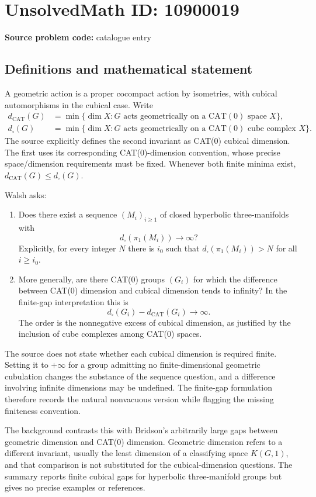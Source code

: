 \documentclass[11pt]{article}
\begin{document}
\section*{UnsolvedMath ID: 10900019}
\textbf{Source problem code:} catalogue entry
\subsection{Definitions and mathematical statement}
A geometric action is a proper cocompact action by isometries, with cubical automorphisms in the cubical case. Write
\[\begin{split}
d_{\mathrm{CAT}}(G)&=\min\{\dim X:G\text{ acts geometrically on a CAT}(0)\text{ space }X\},\\
d_{\square}(G)&=\min\{\dim X:G\text{ acts geometrically on a CAT}(0)\text{ cube complex }X\}.
\end{split}\]
The source explicitly defines the second invariant as CAT(0) cubical dimension. The first uses its corresponding CAT(0)-dimension convention, whose precise space/dimension requirements must be fixed. Whenever both finite minima exist, \(d_{\mathrm{CAT}}(G)\leq d_\square(G)\).

Walsh asks:
\begin{enumerate}
\item Does there exist a sequence \((M_i)_{i\geq1}\) of closed hyperbolic three-manifolds with
\[d_\square(\pi_1(M_i))\longrightarrow\infty?\]
Explicitly, for every integer \(N\) there is \(i_0\) such that \(d_\square(\pi_1(M_i))>N\) for all \(i\geq i_0\).
\item More generally, are there CAT(0) groups \((G_i)\) for which the difference between CAT(0) dimension and cubical dimension tends to infinity? In the finite-gap interpretation this is
\[d_\square(G_i)-d_{\mathrm{CAT}}(G_i)\longrightarrow\infty.\]
The order is the nonnegative excess of cubical dimension, as justified by the inclusion of cube complexes among CAT(0) spaces.
\end{enumerate}
The source does not state whether each cubical dimension is required finite. Setting it to \(+\infty\) for a group admitting no finite-dimensional geometric cubulation changes the substance of the sequence question, and a difference involving infinite dimensions may be undefined. The finite-gap formulation therefore records the natural nonvacuous version while flagging the missing finiteness convention.

The background contrasts this with Bridson's arbitrarily large gaps between geometric dimension and CAT(0) dimension. Geometric dimension refers to a different invariant, usually the least dimension of a classifying space \(K(G,1)\), and that comparison is not substituted for the cubical-dimension questions. The summary reports finite cubical gaps for hyperbolic three-manifold groups but gives no precise examples or references.
\end{document}
